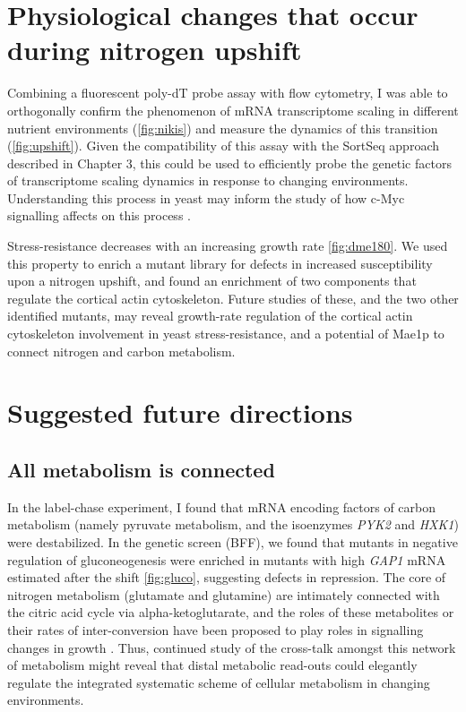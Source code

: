 \section{Physiological changes that occur during nitrogen upshift}

Combining a fluorescent poly-dT probe assay
\parencite{amberg1992isolation} with flow cytometry, I was able to
orthogonally confirm the phenomenon of mRNA transcriptome scaling
in different nutrient environments (\autoref{fig:nikis}) and 
measure the dynamics of this transition (\autoref{fig:upshift}).
Given the compatibility of this assay with the SortSeq approach
described in Chapter 3, this could be used to efficiently probe the 
genetic factors of transcriptome scaling dynamics in response to
changing environments. Understanding this process in yeast may
inform the study of how c-Myc signalling affects on this process
\parencite{nie2012c}.

Stress-resistance decreases with an increasing growth rate
\autoref{fig:dme180}.
We used this property to enrich a mutant library for defects in
increased susceptibility upon a nitrogen upshift, and found an
enrichment of two components that regulate the cortical actin 
cytoskeleton. Future studies of these, and the two other identified
mutants, may reveal growth-rate regulation of the cortical actin 
cytoskeleton involvement in yeast stress-resistance, and a potential
of Mae1p to connect nitrogen and carbon metabolism.

\section{Suggested future directions}

\subsection{All metabolism is connected}

In the label-chase experiment, I found that mRNA encoding factors of
carbon metabolism (namely pyruvate metabolism, and the isoenzymes 
\textit{PYK2} and \textit{HXK1}) were destabilized.
In the genetic screen (BFF), we found that mutants in negative
regulation of gluconeogenesis were enriched in mutants with high
\textit{GAP1} mRNA estimated after the shift
\autoref{fig:gluco}, suggesting defects 
in repression. The core of nitrogen metabolism (glutamate and
glutamine) are intimately connected with the citric acid cycle via
alpha-ketoglutarate, and the roles of these metabolites or their
rates of inter-conversion have been proposed to play roles in
signalling changes in growth \parencite{fayyad2016yeast}.
Thus, continued study of the cross-talk amongst this network of
metabolism might reveal that distal metabolic read-outs could
elegantly regulate the integrated systematic scheme of cellular 
metabolism in changing environments.


